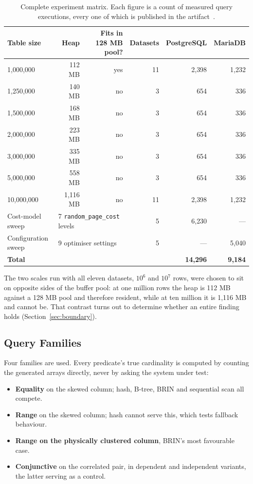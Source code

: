 \documentclass[12pt, a4paper]{article}
\newcommand{\rpc}{\texttt{random\_page\_cost}}
\begin{document}
\begin{table}[htbp]
\centering
\caption{Complete experiment matrix. Each figure is a count of measured
query executions, every one of which is published in the
artifact~\cite{artifact2026}.}
\label{tab:matrix}
\small
\begin{tabular}{@{}lrrrrr@{}}
\toprule
\textbf{Table size} & \textbf{Heap} & \textbf{Fits in 128 MB pool?} & \textbf{Datasets} & \textbf{PostgreSQL} & \textbf{MariaDB} \\
\midrule
1{,}000{,}000 & 112 MB & yes & 11 & 2{,}398 & 1{,}232 \\
1{,}250{,}000 & 140 MB & no & 3 & 654 & 336 \\
1{,}500{,}000 & 168 MB & no & 3 & 654 & 336 \\
2{,}000{,}000 & 223 MB & no & 3 & 654 & 336 \\
3{,}000{,}000 & 335 MB & no & 3 & 654 & 336 \\
5{,}000{,}000 & 558 MB & no & 3 & 654 & 336 \\
10{,}000{,}000 & 1{,}116 MB & no & 11 & 2{,}398 & 1{,}232 \\
\midrule
Cost-model sweep & \multicolumn{2}{l}{7 \rpc{} levels} & 5 & 6{,}230 & --- \\
Configuration sweep & \multicolumn{2}{l}{9 optimiser settings} & 5 & --- & 5{,}040 \\
\midrule
\textbf{Total} & & & & \textbf{14{,}296} & \textbf{9{,}184} \\
\bottomrule
\end{tabular}
\end{table}

\noindent
The two scales run with all eleven datasets, $10^6$ and $10^7$ rows,
were chosen to sit on opposite sides of the buffer pool: at one million
rows the heap is 112 MB against a 128 MB pool and therefore resident,
while at ten million it is 1,116 MB and cannot be. That contrast turns
out to determine whether an entire finding holds
(Section~\ref{sec:boundary}).

\subsection{Query Families}

Four families are used. Every predicate's true cardinality is computed
by counting the generated arrays directly, never by asking the system
under test:

\begin{itemize}[nosep]
\item \textbf{Equality} on the skewed column; hash, B-tree, BRIN and
  sequential scan all compete.
\item \textbf{Range} on the skewed column; hash cannot serve this, which
  tests fallback behaviour.
\item \textbf{Range on the physically clustered column}, BRIN's most
  favourable case.
\item \textbf{Conjunctive} on the correlated pair, in dependent and
  independent variants, the latter serving as a control.
\end{itemize}
\end{document}
